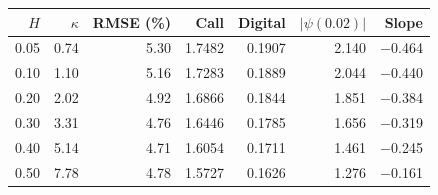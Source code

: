 \begin{tabular}{rrrrrrr}
\toprule
$H$ & $\kappa$ & RMSE (\%) & Call & Digital & $|\psi(0.02)|$ & Slope\\
\midrule
0.05 & 0.74 & 5.30 & 1.7482 & 0.1907 & 2.140 & $-$0.464\\
0.10 & 1.10 & 5.16 & 1.7283 & 0.1889 & 2.044 & $-$0.440\\
0.20 & 2.02 & 4.92 & 1.6866 & 0.1844 & 1.851 & $-$0.384\\
0.30 & 3.31 & 4.76 & 1.6446 & 0.1785 & 1.656 & $-$0.319\\
0.40 & 5.14 & 4.71 & 1.6054 & 0.1711 & 1.461 & $-$0.245\\
0.50 & 7.78 & 4.78 & 1.5727 & 0.1626 & 1.276 & $-$0.161\\
\bottomrule
\end{tabular}
